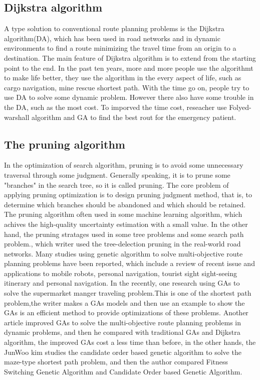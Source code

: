 \documentclass[12pt]{article}
\begin{document}
\subsection{Dijkstra algorithm}
A type solution to conventional route planning problems is the Dijkstra algorithm(DA), which has been used in road networks and in dynamic environments to find a route minimizing the travel time from an origin to a destination. The main feature of Dijkstra algorithm is to extend from the starting point to the end. In the past ten years, more and more people use the algorithmt to make life better, they use the algorithm in the every aspect of life, such as cargo navigation, mine rescue shortest path. With the time go on, people try to use DA to solve some dynamic problem\cite{10.1007/978-3-319-60042-0_15}. However there also have some trouble in the DA, such as the most cost. To imporved the time cost, reseacher use Folyed-warshall algorithm and GA to find the best rout for the emergency patient\cite{Risald2017}. 

\subsection{The pruning algorithm}
In the optimization of search algorithm, pruning is to avoid some unnecessary traversal through some judgment. Generally speaking, it is to prune some "branches" in the search tree, so it is called pruning. The core problem of applying pruning optimization is to design pruning judgment method, that is, to determine which branches should be abandoned and which should be retained. The pruning algorithm often used in some machine learning algorithm\cite{Hu2019}, which achives the high-quality uncertainty estimation with a small value. In the other hand, the pruning stratages used in some tree problems and some search path problem.\cite{10.1007/978-3-642-28493-9_10}, which writer used the tree-delection pruning in the real-world road networks.
Many studies using genetic algorithm to solve multi-objective route planning problems have been reported, which include a review of recent issue and applications to mobile robots, personal navigation, tourist sight sight-seeing itinerary and personal navigation. In the recently, one research using GAs to solve the supermarket manger traveling problem\cite{Al-hayali2018}.This is one of the shortest path problem,the writer makes a GAs models and then use an example to show the GAs is an efficient method to provide optimizations of these problems. Another article\cite{Kanoh2008} improved GAs to solve the multi-objective route planning problems in dynamic problems, and then he compared with traditional GAs and Dijkstra algorithm, the improved GAs cost a less time than before, in the other hands, the JunWoo\cite{Kim2019} kim studies the candidate order based genetic algorithm to solve the maze-type shortest path problem, and then the author compared Fitness Switching Genetic Algorithm and Candidate Order based Genetic Algorithm. 
\end{document}
